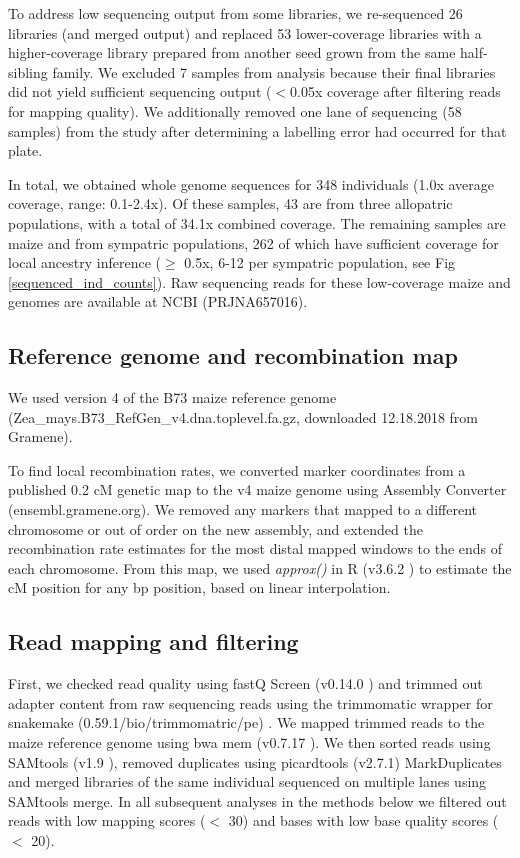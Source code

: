 To address low sequencing output from some libraries, we re-sequenced 26 libraries (and merged output) and replaced 53 lower-coverage libraries with a higher-coverage library prepared from another seed grown from the same half-sibling family.
We excluded 7 samples from analysis because their final libraries did not yield sufficient sequencing output ($<$0.05x coverage after filtering reads for mapping quality). 
We additionally removed one lane of sequencing (58 samples) from the study after determining a labelling error had occurred for that plate. 

In total, we obtained whole genome sequences for 348 individuals (1.0x average coverage, range: 0.1-2.4x). 
Of these samples, 43 are \mexicana from three allopatric populations, with a total of 34.1x combined coverage. 
The remaining samples are maize and \mexicana from sympatric populations, 262 of which have sufficient coverage for local ancestry inference ($\geq$ 0.5x, 6-12 per sympatric population, see Fig \ref{sequenced_ind_counts}). 
Raw sequencing reads for these low-coverage maize and \mexicana genomes are available at NCBI (PRJNA657016).

\subsection*{Reference genome and recombination map}
We used version 4 of the B73 maize reference genome \cite{Jiao:2017} (Zea\_mays.B73\_RefGen\_v4.dna.toplevel.fa.gz, downloaded 12.18.2018 from Gramene). 

To find local recombination rates, we converted marker coordinates from a published 0.2 cM genetic map \cite{Ogut:2015df} to the v4 maize genome using Assembly Converter (ensembl.gramene.org). 
We removed any markers that mapped to a different chromosome or out of order on the new assembly, and extended the recombination rate estimates for the most distal mapped windows to the ends of each chromosome. %
From this map, we used \textit{approx()} in R (v3.6.2 \cite{R_stats}) to estimate the cM position for any bp position, based on linear interpolation.

\subsection*{Read mapping and filtering}
First, we checked read quality using fastQ Screen (v0.14.0 \cite{Wingett:2018_fastqscreen}) and trimmed out adapter content from raw sequencing reads using the trimmomatic wrapper for snakemake (0.59.1/bio/trimmomatric/pe) \cite{Bolger:2014_trimmomatic}.
We mapped trimmed reads to the maize reference genome using bwa mem (v0.7.17 \cite{Li:2013_bwa}). 
We then sorted reads using SAMtools (v1.9 \cite{Li:2009samtools}), removed duplicates using picardtools (v2.7.1) MarkDuplicates and merged libraries of the same individual sequenced on multiple lanes using SAMtools merge. 
In all subsequent analyses in the methods below we filtered out reads with low mapping scores ($<$ 30) and bases with low base quality scores ($<$ 20).


